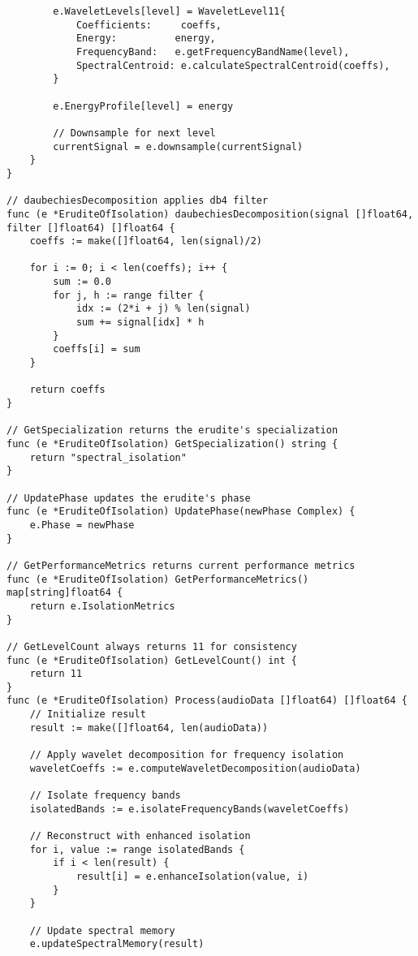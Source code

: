 \begin{tcolorbox}[colback=CodeBackground, colframe=DarkGray, title=Erudite of Isolation Implementation, fonttitle=\bfseries]
\begin{verbatim}
        e.WaveletLevels[level] = WaveletLevel11{
            Coefficients:     coeffs,
            Energy:          energy,
            FrequencyBand:   e.getFrequencyBandName(level),
            SpectralCentroid: e.calculateSpectralCentroid(coeffs),
        }
        
        e.EnergyProfile[level] = energy
        
        // Downsample for next level
        currentSignal = e.downsample(currentSignal)
    }
}

// daubechiesDecomposition applies db4 filter
func (e *EruditeOfIsolation) daubechiesDecomposition(signal []float64, filter []float64) []float64 {
    coeffs := make([]float64, len(signal)/2)
    
    for i := 0; i < len(coeffs); i++ {
        sum := 0.0
        for j, h := range filter {
            idx := (2*i + j) % len(signal)
            sum += signal[idx] * h
        }
        coeffs[i] = sum
    }
    
    return coeffs
}

// GetSpecialization returns the erudite's specialization
func (e *EruditeOfIsolation) GetSpecialization() string {
    return "spectral_isolation"
}

// UpdatePhase updates the erudite's phase
func (e *EruditeOfIsolation) UpdatePhase(newPhase Complex) {
    e.Phase = newPhase
}

// GetPerformanceMetrics returns current performance metrics
func (e *EruditeOfIsolation) GetPerformanceMetrics() map[string]float64 {
    return e.IsolationMetrics
}

// GetLevelCount always returns 11 for consistency
func (e *EruditeOfIsolation) GetLevelCount() int {
    return 11
}
func (e *EruditeOfIsolation) Process(audioData []float64) []float64 {
    // Initialize result
    result := make([]float64, len(audioData))
    
    // Apply wavelet decomposition for frequency isolation
    waveletCoeffs := e.computeWaveletDecomposition(audioData)
    
    // Isolate frequency bands
    isolatedBands := e.isolateFrequencyBands(waveletCoeffs)
    
    // Reconstruct with enhanced isolation
    for i, value := range isolatedBands {
        if i < len(result) {
            result[i] = e.enhanceIsolation(value, i)
        }
    }
    
    // Update spectral memory
    e.updateSpectralMemory(result)
    

\end{verbatim}
\end{tcolorbox}
